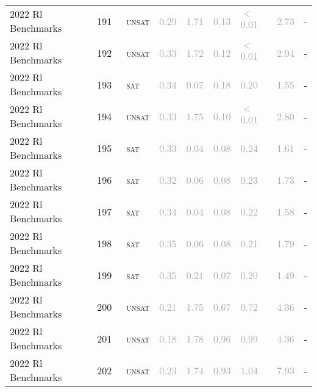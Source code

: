 \begin{center}
{\begin{longtable}{@{}lllllllll@{}}
2022 Rl Benchmarks & 191 & ~\textsc{unsat} & \textcolor{darkgray}{0.29} & \textcolor{darkgray}{1.71} & \textcolor{darkgray}{0.13} & \textcolor{darkgray}{$<$0.01} & \textcolor{darkgray}{2.73} & - \\
2022 Rl Benchmarks & 192 & ~\textsc{unsat} & \textcolor{darkgray}{0.33} & \textcolor{darkgray}{1.72} & \textcolor{darkgray}{0.12} & \textcolor{darkgray}{$<$0.01} & \textcolor{darkgray}{2.94} & - \\
2022 Rl Benchmarks & 193 & ~\textsc{sat} & \textcolor{darkgray}{0.34} & \textcolor{darkgray}{0.07} & \textcolor{darkgray}{0.18} & \textcolor{darkgray}{0.20} & \textcolor{darkgray}{1.55} & - \\
2022 Rl Benchmarks & 194 & ~\textsc{unsat} & \textcolor{darkgray}{0.33} & \textcolor{darkgray}{1.75} & \textcolor{darkgray}{0.10} & \textcolor{darkgray}{$<$0.01} & \textcolor{darkgray}{2.80} & - \\
2022 Rl Benchmarks & 195 & ~\textsc{sat} & \textcolor{darkgray}{0.33} & \textcolor{darkgray}{0.04} & \textcolor{darkgray}{0.08} & \textcolor{darkgray}{0.24} & \textcolor{darkgray}{1.61} & - \\
2022 Rl Benchmarks & 196 & ~\textsc{sat} & \textcolor{darkgray}{0.32} & \textcolor{darkgray}{0.06} & \textcolor{darkgray}{0.08} & \textcolor{darkgray}{0.23} & \textcolor{darkgray}{1.73} & - \\
2022 Rl Benchmarks & 197 & ~\textsc{sat} & \textcolor{darkgray}{0.34} & \textcolor{darkgray}{0.04} & \textcolor{darkgray}{0.08} & \textcolor{darkgray}{0.22} & \textcolor{darkgray}{1.58} & - \\
2022 Rl Benchmarks & 198 & ~\textsc{sat} & \textcolor{darkgray}{0.35} & \textcolor{darkgray}{0.06} & \textcolor{darkgray}{0.08} & \textcolor{darkgray}{0.21} & \textcolor{darkgray}{1.79} & - \\
2022 Rl Benchmarks & 199 & ~\textsc{sat} & \textcolor{darkgray}{0.35} & \textcolor{darkgray}{0.21} & \textcolor{darkgray}{0.07} & \textcolor{darkgray}{0.20} & \textcolor{darkgray}{1.49} & - \\
2022 Rl Benchmarks & 200 & ~\textsc{unsat} & \textcolor{darkgray}{0.21} & \textcolor{darkgray}{1.75} & \textcolor{darkgray}{0.67} & \textcolor{darkgray}{0.72} & \textcolor{darkgray}{4.36} & - \\
2022 Rl Benchmarks & 201 & ~\textsc{unsat} & \textcolor{darkgray}{0.18} & \textcolor{darkgray}{1.78} & \textcolor{darkgray}{0.96} & \textcolor{darkgray}{0.99} & \textcolor{darkgray}{4.36} & - \\
2022 Rl Benchmarks & 202 & ~\textsc{unsat} & \textcolor{darkgray}{0.23} & \textcolor{darkgray}{1.74} & \textcolor{darkgray}{0.93} & \textcolor{darkgray}{1.04} & \textcolor{darkgray}{7.93} & - \\

\end{longtable}}
\end{center}
